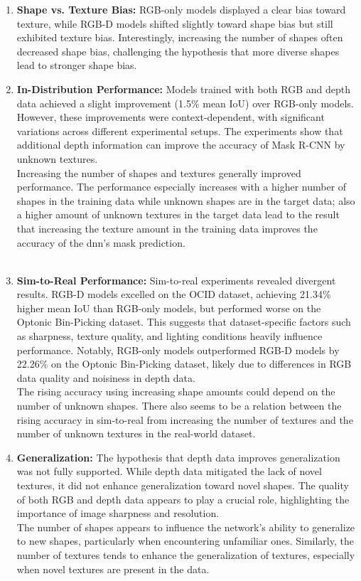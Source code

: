 		\begin{enumerate}
			\item \textbf{Shape vs. Texture Bias:} RGB-only models displayed a clear bias toward texture, while RGB-D models shifted slightly toward shape bias but still exhibited texture bias. Interestingly, increasing the number of shapes often decreased shape bias, challenging the hypothesis that more diverse shapes lead to stronger shape bias.
			
			\item \textbf{In-Distribution Performance:} Models trained with both RGB and depth data achieved a slight improvement (1.5\% mean IoU) over RGB-only models. However, these improvements were context-dependent, with significant variations across different experimental setups. The experiments show that additional depth information can improve the accuracy of Mask R-CNN by unknown textures.\\
			Increasing the number of shapes and textures generally improved performance. The performance especially increases with a higher number of shapes in the training data while unknown shapes are in the target data; also a higher amount of unknown textures in the target data lead to the result that increasing the texture amount in the training data improves the accuracy of the \ac{dnn}'s mask prediction. 
			\\
			\\
			\item \textbf{Sim-to-Real Performance:} Sim-to-real experiments revealed divergent results. RGB-D models excelled on the OCID dataset, achieving 21.34\% higher mean IoU than RGB-only models, but performed worse on the Optonic Bin-Picking dataset. This suggests that dataset-specific factors such as sharpness, texture quality, and lighting conditions heavily influence performance. Notably, RGB-only models outperformed RGB-D models by 22.26\% on the Optonic Bin-Picking dataset, likely due to differences in RGB data quality and noisiness in depth data.\\
			The rising accuracy using increasing shape amounts could depend on the number of unknown shapes. There also seems to be a relation between the rising accuracy in sim-to-real from increasing the number of textures and the number of unknown textures in the real-world dataset.
			
			\item \textbf{Generalization:} The hypothesis that depth data improves generalization was not fully supported. While depth data mitigated the lack of novel textures, it did not enhance generalization toward novel shapes. The quality of both RGB and depth data appears to play a crucial role, highlighting the importance of image sharpness and resolution.\\
			The number of shapes appears to influence the network's ability to generalize to new shapes, particularly when encountering unfamiliar ones. Similarly, the number of textures tends to enhance the generalization of textures, especially when novel textures are present in the data.
		\end{enumerate}
		

